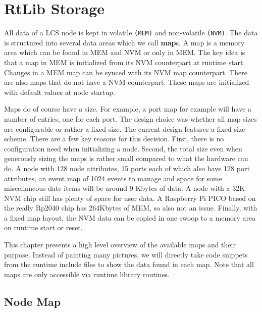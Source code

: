 \chapter{RtLib Storage}

All data of a LCS node is kept in volatile \texttt{(MEM)} and non-volatile \texttt{(NVM)}. The data is structured into several data areas which we call \textbf{map}s. A map is a memory area which can be found in MEM and NVM or only in MEM. The key idea is that a map in MEM is initialized from its NVM counterpart at runtime start. Changes in a MEM map can be synced with its NVM map counterpart. There are also maps that do not have a NVM counterpart. These maps are initialized with default values at node startup. 

Maps do of course have a size. For example, a port map for example will have a number of entries, one for each port. The design choice was whether all map sizes are configurable or rather a fixed size. The current design features a fixed size scheme. There are a few key reasons for this decision. First, there is no configuration need when initializing a node. Second, the total size even when generously sizing the maps is rather small compared to what the hardware can do. A node with 128 node attributes, 15 ports each of which also have 128 port attributes, an event map of 1024 events to manage and space for some miscellaneous date items will be around 9 Kbytes of data. A node with a 32K NVM chip still has plenty of space for user data. A Raspberry Pi PICO based on the really Rp2040 chip has 264Kbytes of MEM, so also not an issue. Finally, with a fixed map layout, the NVM data can be copied in one swoop to a memory area on runtime start or reset. 

\FloatBarrier

This chapter presents a high level overview of the available maps and their purpose. Instead of painting many pictures, we will directly take code snippets from the runtime include files to show the data found in each map. Note that all maps are only accessible via runtime library routines.

\section{Node Map}

